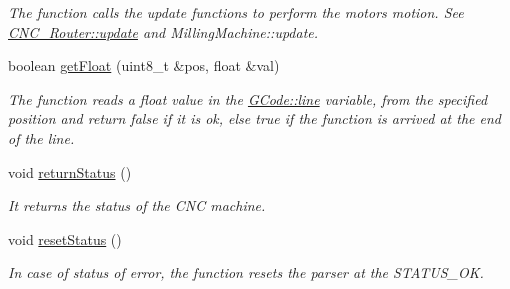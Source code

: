 \begin{DoxyCompactItemize}
\begin{DoxyCompactList}\small\item\em The function calls the update functions to perform the motors motion. See \hyperlink{class_c_n_c___router_a3a8982d9582e2144d38791626b3060e6}{C\+N\+C\+\_\+\+Router\+::update} and Milling\+Machine\+::update. \end{DoxyCompactList}\item 
boolean \hyperlink{class_g_code_abd9c3a13cf8f2958d8d9f0a563855e7b}{get\+Float} (uint8\+\_\+t \&pos, float \&val)
\begin{DoxyCompactList}\small\item\em The function reads a float value in the \hyperlink{class_g_code_a20d7c90740e9e139b24f68336ad8c8f1}{G\+Code\+::line} variable, from the specified position and return false if it is ok, else true if the function is arrived at the end of the line. \end{DoxyCompactList}\item 
void \hyperlink{class_g_code_a9f7a4d057f394dcc4163f00a2dc6770e}{return\+Status} ()
\begin{DoxyCompactList}\small\item\em It returns the status of the C\+N\+C machine. \end{DoxyCompactList}\item 
void \hyperlink{class_g_code_ab8dbd55ab693f488c083d4fc97a00044}{reset\+Status} ()
\begin{DoxyCompactList}\small\item\em In case of status of error, the function resets the parser at the S\+T\+A\+T\+U\+S\+\_\+\+O\+K. \end{DoxyCompactList}\end{DoxyCompactItemize}
